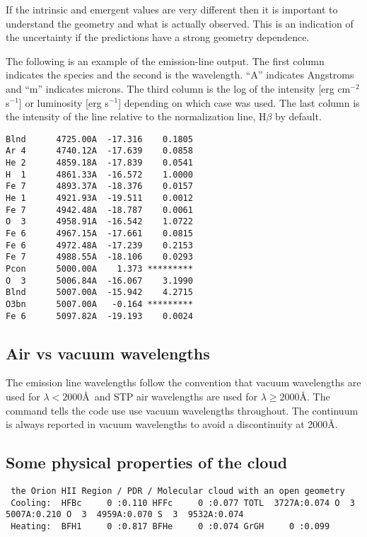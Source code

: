 If the intrinsic and emergent values are very different then it is
important to understand the geometry and what is actually observed.
This
is an indication of the uncertainty if the predictions have a strong
geometry dependence.

The following is an example of the emission-line output.
The first column indicates the species and the second is the wavelength.
``A'' indicates Angstroms and ``m'' indicates microns.
The third column is the log of the intensity [erg cm$^{-2}$ s$^{-1}$] or luminosity [erg s$^{-1}$]
depending on which case was used.
The last column is the intensity of the line relative to the normalization line, H$\beta$ by default.
\begin{verbatim}
Blnd      4725.00A  -17.316    0.1805
Ar 4      4740.12A  -17.639    0.0858
He 2      4859.18A  -17.839    0.0541
H  1      4861.33A  -16.572    1.0000
Fe 7      4893.37A  -18.376    0.0157
He 1      4921.93A  -19.511    0.0012
Fe 7      4942.48A  -18.787    0.0061
O  3      4958.91A  -16.542    1.0722
Fe 6      4967.15A  -17.661    0.0815
Fe 6      4972.48A  -17.239    0.2153
Fe 7      4988.55A  -18.106    0.0293
Pcon      5000.00A    1.373 *********
O  3      5006.84A  -16.067    3.1990
Blnd      5007.00A  -15.942    4.2715
O3bn      5007.00A   -0.164 *********
Fe 6      5097.82A  -19.193    0.0024
\end{verbatim}

\subsection{Air vs vacuum wavelengths}
The emission line wavelengths follow the convention that vacuum wavelengths
are used for $\lambda < 2000$\AA\ and STP air wavelengths are used
for $\lambda \ge 2000$\AA.
The  command tells the code use use vacuum wavelengths throughout.
The continuum is always reported in vacuum wavelengths to avoid 
a discontinuity at 2000\AA.

\subsection{Some physical properties of the cloud}

{\setverbatimfontsize{\tiny}
\begin{verbatim}
 the Orion HII Region / PDR / Molecular cloud with an open geometry
 Cooling:  HFBc     0 :0.110 HFFc     0 :0.077 TOTL  3727A:0.074 O  3  5007A:0.210 O  3  4959A:0.070 S  3  9532A:0.074
 Heating:  BFH1     0 :0.817 BFHe     0 :0.074 GrGH     0 :0.099
\end{verbatim}
}

